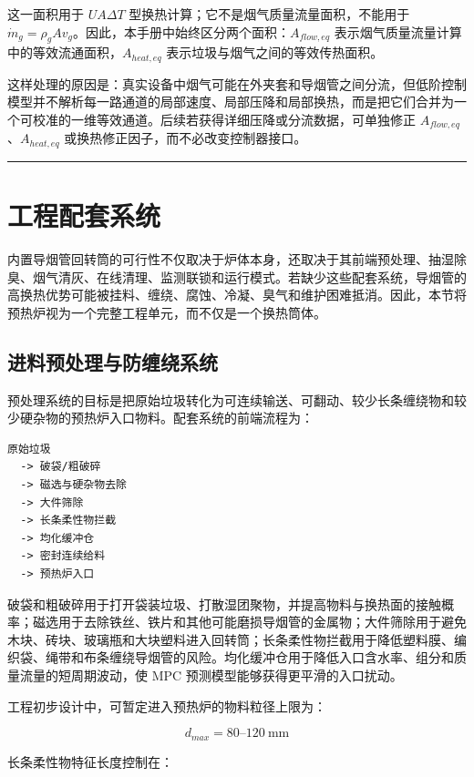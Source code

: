 \documentclass[UTF8,openany,zihao=-4,oneside]{ctexbook}
\newcommand{\manualdivider}{\par\vspace{0.6em}\noindent\textcolor{FGLine}{\rule{\linewidth}{0.7pt}}\vspace{0.6em}\par}
\begin{document}
这一面积用于 \(U A\Delta T\) 型换热计算；它不是烟气质量流量面积，不能用于 \(\dot m_g=\rho_g A v_g\)。因此，本手册中始终区分两个面积：\(A_{flow,eq}\) 表示烟气质量流量计算中的等效流通面积，\(A_{heat,eq}\) 表示垃圾与烟气之间的等效传热面积。

这样处理的原因是：真实设备中烟气可能在外夹套和导烟管之间分流，但低阶控制模型并不解析每一路通道的局部速度、局部压降和局部换热，而是把它们合并为一个可校准的一维等效通道。后续若获得详细压降或分流数据，可单独修正 \(A_{flow,eq}\)、\(A_{heat,eq}\) 或换热修正因子，而不必改变控制器接口。

\manualdivider

\section{工程配套系统}\label{ux5de5ux7a0bux914dux5957ux7cfbux7edf}

内置导烟管回转筒的可行性不仅取决于炉体本身，还取决于其前端预处理、抽湿除臭、烟气清灰、在线清理、监测联锁和运行模式。若缺少这些配套系统，导烟管的高换热优势可能被挂料、缠绕、腐蚀、冷凝、臭气和维护困难抵消。因此，本节将预热炉视为一个完整工程单元，而不仅是一个换热筒体。

\subsection{进料预处理与防缠绕系统}\label{ux8fdbux6599ux9884ux5904ux7406ux4e0eux9632ux7f20ux7ed5ux7cfbux7edf}

预处理系统的目标是把原始垃圾转化为可连续输送、可翻动、较少长条缠绕物和较少硬杂物的预热炉入口物料。配套系统的前端流程为：

\begin{lstlisting}
原始垃圾
  -> 破袋/粗破碎
  -> 磁选与硬杂物去除
  -> 大件筛除
  -> 长条柔性物拦截
  -> 均化缓冲仓
  -> 密封连续给料
  -> 预热炉入口
\end{lstlisting}

破袋和粗破碎用于打开袋装垃圾、打散湿团聚物，并提高物料与换热面的接触概率；磁选用于去除铁丝、铁片和其他可能磨损导烟管的金属物；大件筛除用于避免木块、砖块、玻璃瓶和大块塑料进入回转筒；长条柔性物拦截用于降低塑料膜、编织袋、绳带和布条缠绕导烟管的风险。均化缓冲仓用于降低入口含水率、组分和质量流量的短周期波动，使 MPC 预测模型能够获得更平滑的入口扰动。

工程初步设计中，可暂定进入预热炉的物料粒径上限为：

\[
d_{max}=80\text{--}120\ \mathrm{mm}
\]

长条柔性物特征长度控制在：
\end{document}
